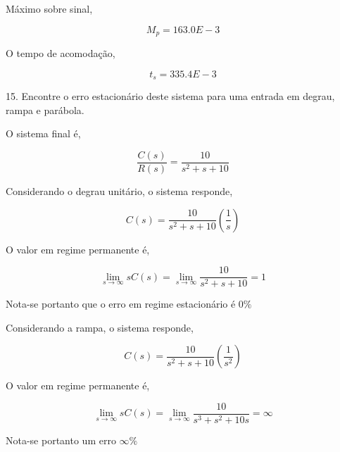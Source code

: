 \documentclass[paper=a4, fontsize=11pt]{article}
\begin{document}
Máximo sobre sinal,

$$
M_p = 163.0E-3
$$

O tempo de acomodação,

$$
t_s  = 335.4E-3
$$


\newpage

15. Encontre o erro estacionário deste sistema para uma entrada em degrau, rampa e parábola.

O sistema final é,

$$
\frac{C(s)}{R(s)} = \frac{10}{s^2 +  s + 10}
$$

Considerando o degrau unitário, o sistema responde,

$$
C(s) = \frac{10}{s^2 +  s + 10}\left(\frac{1}{s}\right)
$$

O valor em regime permanente é,

$$
\lim_{s \to \infty}{s C(s)} = \lim_{s \to \infty}{\frac{10}{s^2 +  s + 10}} = 1
$$

Nota-se portanto que o erro em regime estacionário é $0 \%$

Considerando a rampa, o sistema responde,

$$
C(s) = \frac{10}{s^2 +  s + 10}\left(\frac{1}{s^2}\right)
$$

O valor em regime permanente é,

$$
\lim_{s \to \infty}{s C(s)} = \lim_{s \to \infty}{\frac{10}{s^3 +  s^2 + 10 s}} = \infty
$$

Nota-se portanto um erro $\infty \%$
\end{document}
